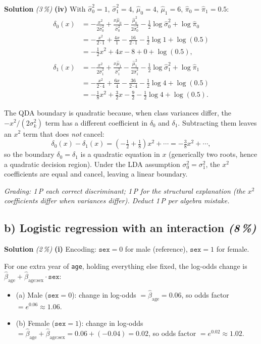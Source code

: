 \documentclass[11pt,a4paper]{article}
\newcommand{\subpoints}[1]{\textit{(#1\,\%)}}
\newcommand{\sol}{\noindent\textbf{Solution}}
\begin{document}
\medskip
\sol{} \subpoints{3} \textbf{(iv)} With $\hat\sigma_0^2=1$, $\hat\sigma_1^2=4$, $\hat\mu_0=4$, $\hat\mu_1=6$,
$\hat\pi_0=\hat\pi_1=0.5$:
\begin{align*}
\delta_0(x) &= -\frac{x^2}{2\hat\sigma_0^2} + \frac{x\hat\mu_0}{\hat\sigma_0^2}
              - \frac{\hat\mu_0^2}{2\hat\sigma_0^2} - \tfrac{1}{2}\log\hat\sigma_0^2 + \log\hat\pi_0 \\[2pt]
            &= -\frac{x^2}{2\cdot 1} + \frac{4x}{1} - \frac{16}{2\cdot 1} - \tfrac{1}{2}\log 1 + \log(0.5) \\[2pt]
            &= -\tfrac{1}{2}x^2 + 4x - 8 + 0 + \log(0.5), \\[6pt]
\delta_1(x) &= -\frac{x^2}{2\hat\sigma_1^2} + \frac{x\hat\mu_1}{\hat\sigma_1^2}
              - \frac{\hat\mu_1^2}{2\hat\sigma_1^2} - \tfrac{1}{2}\log\hat\sigma_1^2 + \log\hat\pi_1 \\[2pt]
            &= -\frac{x^2}{2\cdot 4} + \frac{6x}{4} - \frac{36}{2\cdot 4} - \tfrac{1}{2}\log 4 + \log(0.5) \\[2pt]
            &= -\tfrac{1}{8}x^2 + \tfrac{3}{2}x - \tfrac{9}{2} - \tfrac{1}{2}\log 4 + \log(0.5).
\end{align*}

The QDA boundary is quadratic because, when class variances differ, the $-x^2/(2\sigma_k^2)$ term has a
different coefficient in $\delta_0$ and $\delta_1$. Subtracting them leaves an $x^2$ term that does \emph{not}
cancel:
$$\delta_0(x) - \delta_1(x) = \left(-\tfrac{1}{2} + \tfrac{1}{8}\right)x^2 + \cdots
   = -\tfrac{3}{8}x^2 + \cdots,$$
so the boundary $\delta_0=\delta_1$ is a quadratic equation in $x$ (generically two roots, hence a
quadratic decision region). Under the LDA assumption $\sigma_0^2=\sigma_1^2$, the $x^2$ coefficients are
equal and cancel, leaving a linear boundary.

\noindent\emph{Grading: 1\,P each correct discriminant; 1\,P for the structural explanation (the $x^2$
coefficients differ when variances differ). Deduct 1\,P per algebra mistake.}

\subsection*{b) Logistic regression with an interaction \subpoints{8}}

\sol{} \subpoints{2} \textbf{(i)} Encoding: $\texttt{sex}=0$ for male (reference), $\texttt{sex}=1$ for female.

For one extra year of \texttt{age}, holding everything else fixed, the log-odds change is
$\hat\beta_{\text{age}} + \hat\beta_{\text{age:sex}}\cdot\texttt{sex}$:
\begin{itemize}
  \item (a) Male ($\texttt{sex}=0$): change in log-odds $=\hat\beta_{\text{age}} = 0.06$,
        so odds factor $= e^{0.06} \approx \boxed{1.06}$.
  \item (b) Female ($\texttt{sex}=1$): change in log-odds
        $=\hat\beta_{\text{age}} + \hat\beta_{\text{age:sex}} = 0.06 + (-0.04) = 0.02$,
        so odds factor $= e^{0.02} \approx \boxed{1.02}$.
\end{itemize}
\end{document}
